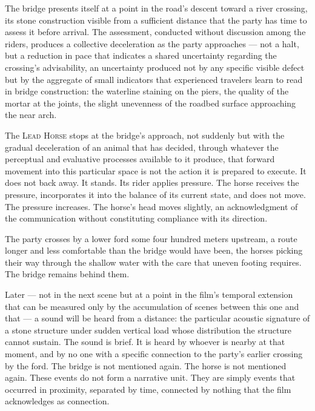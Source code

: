 \documentclass[12pt, oneside]{article}
\newenvironment{action}{%
  \vspace{0.6em}%
  \noindent\ignorespaces%
}{%
  \par\vspace{0.6em}%
}
\begin{document}
\begin{action}
The bridge presents itself at a point in the road's descent toward a river crossing, its stone construction visible from a sufficient distance that the party has time to assess it before arrival. The assessment, conducted without discussion among the riders, produces a collective deceleration as the party approaches --- not a halt, but a reduction in pace that indicates a shared uncertainty regarding the crossing's advisability, an uncertainty produced not by any specific visible defect but by the aggregate of small indicators that experienced travelers learn to read in bridge construction: the waterline staining on the piers, the quality of the mortar at the joints, the slight unevenness of the roadbed surface approaching the near arch.

The \textsc{Lead Horse} stops at the bridge's approach, not suddenly but with the gradual deceleration of an animal that has decided, through whatever the perceptual and evaluative processes available to it produce, that forward movement into this particular space is not the action it is prepared to execute. It does not back away. It stands. Its rider applies pressure. The horse receives the pressure, incorporates it into the balance of its current state, and does not move. The pressure increases. The horse's head moves slightly, an acknowledgment of the communication without constituting compliance with its direction.

The party crosses by a lower ford some four hundred meters upstream, a route longer and less comfortable than the bridge would have been, the horses picking their way through the shallow water with the care that uneven footing requires. The bridge remains behind them.
\end{action}

\begin{action}
Later --- not in the next scene but at a point in the film's temporal extension that can be measured only by the accumulation of scenes between this one and that --- a sound will be heard from a distance: the particular acoustic signature of a stone structure under sudden vertical load whose distribution the structure cannot sustain. The sound is brief. It is heard by whoever is nearby at that moment, and by no one with a specific connection to the party's earlier crossing by the ford. The bridge is not mentioned again. The horse is not mentioned again. These events do not form a narrative unit. They are simply events that occurred in proximity, separated by time, connected by nothing that the film acknowledges as connection.
\end{action}
\end{document}
